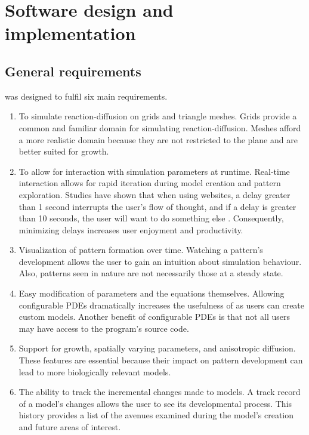 \chapter{Software design and  implementation}

\section{General requirements}
\ProgramName{} was designed to fulfil six main requirements.

\begin{enumerate}
	\item To simulate reaction-diffusion on grids and triangle meshes. Grids provide a common and familiar domain for simulating reaction-diffusion. Meshes afford a more realistic domain because they are not restricted to the plane and are better suited for growth. 
	
	\item To allow for interaction with simulation parameters at runtime. Real-time interaction allows for rapid iteration during model creation and pattern exploration. Studies have shown that when using websites, a delay greater than 1 second interrupts the user's flow of thought, and if a delay is greater than 10 seconds, the user will want to do something else \citep{nielsen1994}. Consequently, minimizing delays increases user enjoyment and productivity. 

	\item Visualization of pattern formation over time. Watching a pattern's development allows the user to gain an intuition about simulation behaviour. Also, patterns seen in nature are not necessarily those at a steady state.
	
	\item Easy modification of parameters and the equations themselves. Allowing configurable PDEs dramatically increases the usefulness of \ProgramName{} as users can create custom models. Another benefit of configurable PDEs is that not all users may have access to the program's source code. 
		
	\item Support for growth, spatially varying parameters, and anisotropic diffusion. These features are essential because their impact on pattern development can lead to more biologically relevant models. 
	
	\item The ability to track the incremental changes made to models. A track record of a model's changes allows the user to see its developmental process. This history provides a list of the avenues examined during the model's creation and future areas of interest.
\end{enumerate}

